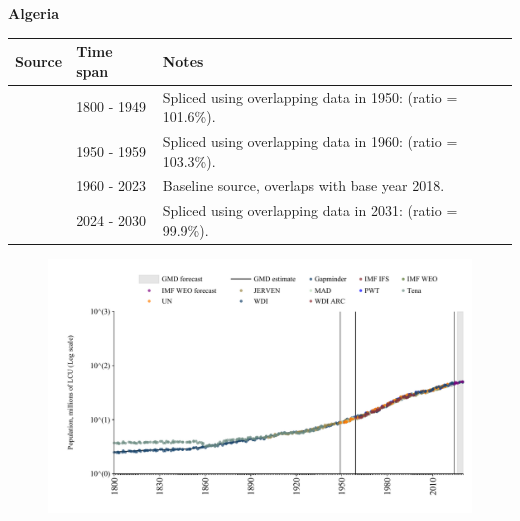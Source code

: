 \documentclass[12pt,a4paper,landscape]{article}
\begin{document}
\begin{adjustbox}{max totalsize={\paperwidth}{\paperheight},center}
\begin{minipage}[t][\textheight][t]{\textwidth}
\vspace*{0.5cm}
{}
\begin{center}
{\Large\bfseries Algeria}
\end{center}
\vspace{0.5cm}
\begin{table}[H]
\centering
\small
\begin{tabular}{|l|l|l|}
\hline
\textbf{Source} & \textbf{Time span} & \textbf{Notes} \\
\hline
\rowcolor{white}\cite{Gapminder}& 1800 - 1949 &Spliced using overlapping data in 1950: (ratio = 101.6\%).\\
\rowcolor{lightgray}\cite{IMF_IFS}& 1950 - 1959 &Spliced using overlapping data in 1960: (ratio = 103.3\%).\\
\rowcolor{white}\cite{WDI}& 1960 - 2023 &Baseline source, overlaps with base year 2018.\\
\rowcolor{lightgray}\cite{Gapminder}& 2024 - 2030 &Spliced using overlapping data in 2031: (ratio = 99.9\%).\\
\hline
\end{tabular}
\end{table}
\begin{figure}[H]
\centering
\includegraphics[width=\textwidth,height=0.6\textheight,keepaspectratio]{graphs/DZA_pop.pdf}
\end{figure}
\end{minipage}
\end{adjustbox}
\end{document}
